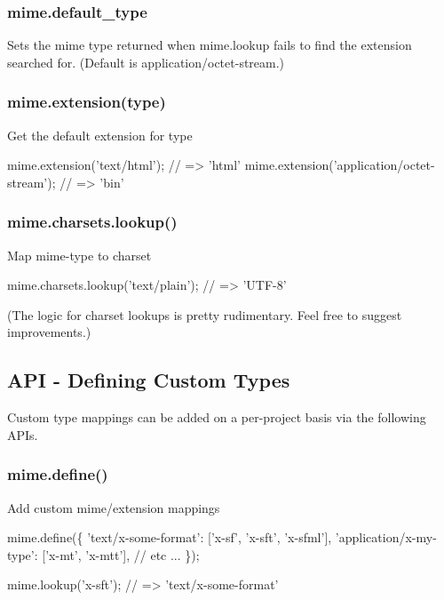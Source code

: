 \subsubsection*{mime.\+default\+\_\+type}

Sets the mime type returned when {\ttfamily mime.\+lookup} fails to find the extension searched for. (Default is {\ttfamily application/octet-\/stream}.)

\subsubsection*{mime.\+extension(type)}

Get the default extension for {\ttfamily type}


\begin{DoxyCode}
mime.extension(\textcolor{stringliteral}{'text/html'});                 \textcolor{comment}{// => 'html'}
mime.extension(\textcolor{stringliteral}{'application/octet-stream'});  \textcolor{comment}{// => 'bin'}
\end{DoxyCode}


\subsubsection*{mime.\+charsets.\+lookup()}

Map mime-\/type to charset


\begin{DoxyCode}
mime.charsets.lookup(\textcolor{stringliteral}{'text/plain'});        \textcolor{comment}{// => 'UTF-8'}
\end{DoxyCode}


(The logic for charset lookups is pretty rudimentary. Feel free to suggest improvements.)

\subsection*{A\+P\+I -\/ Defining Custom Types}

Custom type mappings can be added on a per-\/project basis via the following A\+P\+Is.

\subsubsection*{mime.\+define()}

Add custom mime/extension mappings


\begin{DoxyCode}
mime.define(\{
    \textcolor{stringliteral}{'text/x-some-format'}: [\textcolor{stringliteral}{'x-sf'}, \textcolor{stringliteral}{'x-sft'}, \textcolor{stringliteral}{'x-sfml'}],
    \textcolor{stringliteral}{'application/x-my-type'}: [\textcolor{stringliteral}{'x-mt'}, \textcolor{stringliteral}{'x-mtt'}],
    \textcolor{comment}{// etc ...}
\});

mime.lookup(\textcolor{stringliteral}{'x-sft'});                 \textcolor{comment}{// => 'text/x-some-format'}
\end{DoxyCode}


